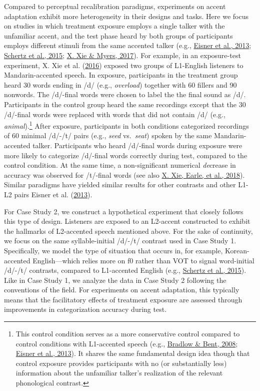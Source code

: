 \documentclass[
  11pt,
  man,floatsintext]{apa6}
\begin{document}
Compared to perceptual recalibration paradigms, experiments on accent adaptation exhibit more heterogeneity in their designs and tasks. Here we focus on studies in which treatment exposure employs a single talker with the unfamiliar accent, and the test phase heard by both groups of participants employs different stimuli from the same accented talker (e.g., \protect\hyperlink{ref-eisner2013}{Eisner et al., 2013}; \protect\hyperlink{ref-schertz2015}{Schertz et al., 2015}; \protect\hyperlink{ref-xie2017}{X. Xie \& Myers, 2017}). For example, in an exposure-test experiment, X. Xie et al. (\protect\hyperlink{ref-xie2016jep}{2016}) exposed two groups of L1-English listeners to Mandarin-accented speech. In exposure, participants in the treatment group heard 30 words ending in /d/ (e.g., \emph{overload}) together with 60 fillers and 90 nonwords. The /d/-final words were chosen to label the the final sound as /d/. Participants in the control group heard the same recordings except that the 30 /d/-final words were replaced with words that did not contain /d/ (e.g., \emph{animal}).\footnote{This control condition serves as a more conservative control compared to control conditions with L1-accented speech (e.g., \protect\hyperlink{ref-bradlow-bent2008}{Bradlow \& Bent, 2008}; \protect\hyperlink{ref-eisner2013}{Eisner et al., 2013}). It shares the same fundamental design idea though that control exposure provides participants with no (or substantially less) information about the unfamiliar talker's realization of the relevant phonological contrast.}
After exposure, participants in both conditions categorized recordings of 60 minimal /d/-/t/ pairs (e.g., \emph{seed} vs.~\emph{seat}) spoken by the same Mandarin-accented talker. Participants who heard /d/-final words during exposure were more likely to categorize /d/-final words correctly during test, compared to the control condition. At the same time, a non-significant numerical \emph{de}crease in accuracy was observed for /t/-final words (see also \protect\hyperlink{ref-xie2018lcn}{X. Xie, Earle, et al., 2018}). Similar paradigms have yielded similar results for other contrasts and other L1-L2 pairs Eisner et al. (\protect\hyperlink{ref-eisner2013}{2013}).

For Case Study 2, we construct a hypothetical experiment that closely follows this type of design. Listeners are exposed to an L2-accent constructed to exhibit the hallmarks of L2-accented speech mentioned above. For the sake of continuity, we focus on the same syllable-initial /d/-/t/ contrast used in Case Study 1. Specifically, we model the type of situation that occurs in, for example, Korean-accented English---which relies more on f0 rather than VOT to signal word-initial /d/-/t/ contrasts, compared to L1-accented English (e.g., \protect\hyperlink{ref-schertz2015}{Schertz et al., 2015}). Like in Case Study 1, we analyze the data in Case Study 2 following the conventions of the field. For experiments on accent adaptation, this typically means that the facilitatory effects of treatment exposure are assessed through improvements in categorization accuracy during test.
\end{document}
